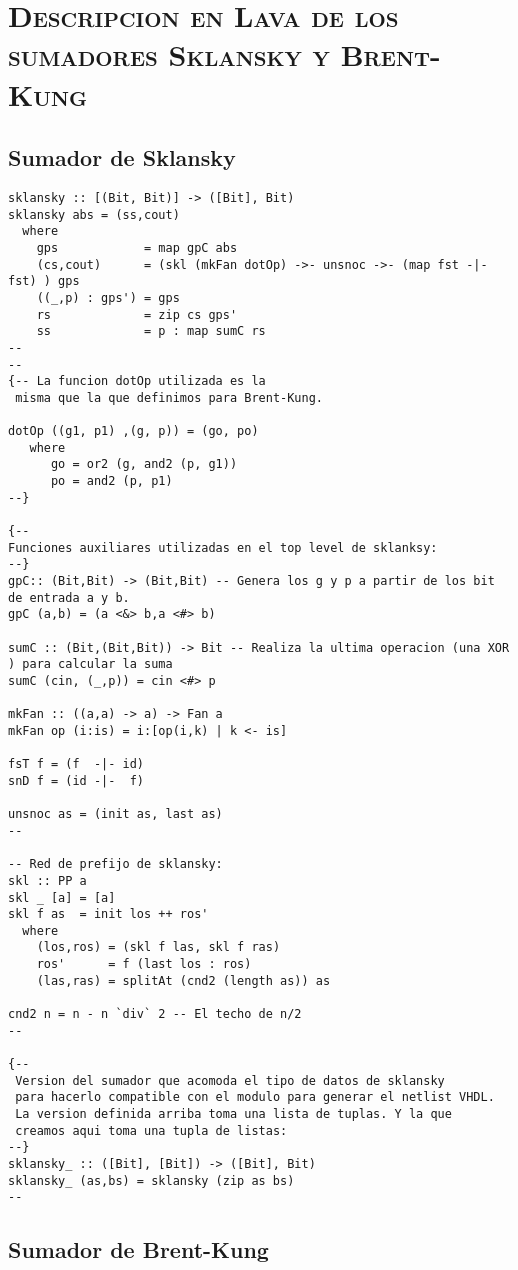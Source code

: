 \chapter{\textsc{ Descripcion en Lava de los sumadores Sklansky y Brent-Kung}}\label{chap:sklansky-lava}
\section{Sumador de Sklansky}
\lstset{language=Haskell} 
\begin{lstlisting}
sklansky :: [(Bit, Bit)] -> ([Bit], Bit)
sklansky abs = (ss,cout)
  where
    gps            = map gpC abs
    (cs,cout)      = (skl (mkFan dotOp) ->- unsnoc ->- (map fst -|- fst) ) gps
    ((_,p) : gps') = gps
    rs             = zip cs gps'
    ss             = p : map sumC rs
--
-- 
{-- La funcion dotOp utilizada es la
 misma que la que definimos para Brent-Kung.

dotOp ((g1, p1) ,(g, p)) = (go, po)
   where
      go = or2 (g, and2 (p, g1))
      po = and2 (p, p1)
--}

{--
Funciones auxiliares utilizadas en el top level de sklanksy:
--}
gpC:: (Bit,Bit) -> (Bit,Bit) -- Genera los g y p a partir de los bit de entrada a y b.
gpC (a,b) = (a <&> b,a <#> b)

sumC :: (Bit,(Bit,Bit)) -> Bit -- Realiza la ultima operacion (una XOR ) para calcular la suma
sumC (cin, (_,p)) = cin <#> p

mkFan :: ((a,a) -> a) -> Fan a
mkFan op (i:is) = i:[op(i,k) | k <- is]

fsT f = (f  -|- id)
snD f = (id -|-  f)

unsnoc as = (init as, last as)
--

-- Red de prefijo de sklansky:
skl :: PP a
skl _ [a] = [a]
skl f as  = init los ++ ros'
  where
    (los,ros) = (skl f las, skl f ras)
    ros'      = f (last los : ros)
    (las,ras) = splitAt (cnd2 (length as)) as

cnd2 n = n - n `div` 2 -- El techo de n/2
--

{--
 Version del sumador que acomoda el tipo de datos de sklansky
 para hacerlo compatible con el modulo para generar el netlist VHDL.
 La version definida arriba toma una lista de tuplas. Y la que 
 creamos aqui toma una tupla de listas:
--}
sklansky_ :: ([Bit], [Bit]) -> ([Bit], Bit) 
sklansky_ (as,bs) = sklansky (zip as bs)
--

\end{lstlisting}


\section{Sumador de Brent-Kung}

